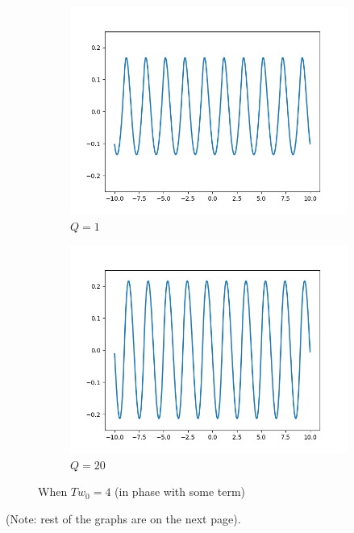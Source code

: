 \documentclass{article}
\begin{document}
\begin{figure}[h!]
    \centering
     \begin{subfigure}[b]{0.49\textwidth}
         \centering
         \includegraphics[width=\linewidth]{1,0.png}
         \caption{$Q=1$}
     \end{subfigure}
     \begin{subfigure}[b]{0.49\textwidth}
         \centering
         \includegraphics[width=\linewidth]{1,1.png}
         \caption{$Q=20$}
     \end{subfigure}
     \caption{When $Tw_0 = 4$ (in phase with some term)}
\end{figure}
(Note: rest of the graphs are on the next page).
\end{document}
